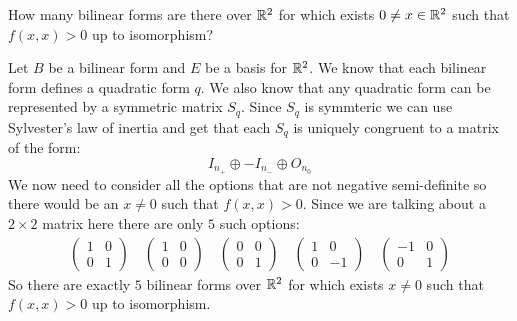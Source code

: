 \documentclass[11pt, a4paper]{article}
\begin{document}
\begin{exercise}
  How many bilinear forms are there over $\mathbb{R}^2$ for which 
  exists $0\neq x\in\mathbb{R}^2$ such that $f(x,x) > 0$ up to isomorphism?
\end{exercise}
\begin{solution}
  Let $B$ be a bilinear form and $E$ be a basis for $\mathbb{R}^2$. We know
  that each bilinear form defines a quadratic form $q$. We also
  know that any quadratic form can be represented by a symmetric matrix $S_q$. 
  Since $S_q$ is symmteric we can use Sylvester's law of inertia and get that 
  each $S_q$ is uniquely congruent to a matrix of the form:
  \[
    I_{n_+} \oplus -I_{n_-} \oplus O_{n_0}
  \]
  We now need to consider all the options that are not negative semi-definite
  so there would be an $x \neq 0$ such that $f(x,x) > 0$.
  Since we are talking about a $2 \times 2$ matrix here there are only $5$
  such options:
  \begin{align*}
    \begin{pmatrix}
      1 & 0 \\
      0 & 1
    \end{pmatrix}
    \quad
    \begin{pmatrix}
      1 & 0 \\
      0 & 0
    \end{pmatrix}
    \quad
    \begin{pmatrix}
      0 & 0 \\
      0 & 1
    \end{pmatrix}
    \quad
    \begin{pmatrix}
      1 & 0 \\
      0 & -1
    \end{pmatrix}
    \quad
    \begin{pmatrix}
      -1 & 0 \\
      0 & 1
    \end{pmatrix}
  \end{align*}
  So there are exactly $5$ bilinear forms over $\mathbb{R}^2$ for which exists $x\neq0$
  such that $f(x,x) > 0$ up to isomorphism.
\end{solution}
\end{document}
